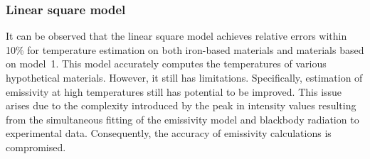 \subsubsection{Linear square model}
It can be observed that the linear square model achieves relative errors 
within 10\% for temperature estimation on both iron-based materials and materials based on \mbox{model 1}. 
This model accurately computes the temperatures of various hypothetical materials. 
However, it still has limitations. Specifically, estimation of emissivity at high temperatures still has 
potential to be improved. 
This issue arises due to the complexity introduced 
by the peak in intensity values resulting from the simultaneous fitting of the 
emissivity model and blackbody radiation to experimental data. 
Consequently, the accuracy of emissivity calculations is compromised.


